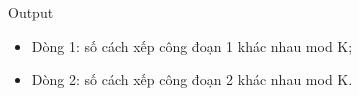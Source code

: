 Output
\begin{itemize}
	\item     Dòng 1: số cách xếp công đoạn 1 khác nhau mod K;   
	\item     Dòng 2: số cách xếp công đoạn 2 khác nhau mod K.   
\end{itemize}